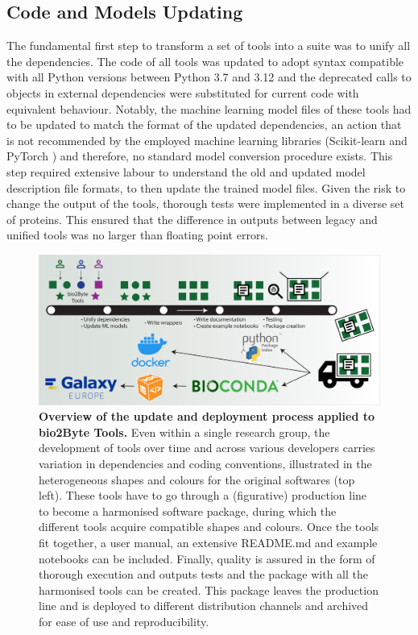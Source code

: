 \subsection{Code and Models Updating}
The fundamental first step to transform a set of tools into a suite was to unify all the dependencies. The code of all tools was updated to adopt syntax compatible with all Python versions between Python 3.7 and 3.12 and the deprecated calls to objects in external dependencies were substituted for current code with equivalent behaviour. Notably, the machine learning model files of these tools had to be updated to match the format of the updated dependencies, an action that is not recommended by the employed machine learning libraries (Scikit-learn \cite{scikit-learn} and PyTorch \cite{paszke_pytorch_2019}) and therefore, no standard model conversion procedure exists. This step required extensive labour to understand the old and updated model description file formats, to then update the trained model files. Given the risk to change the output of the tools, thorough tests were implemented in a diverse set of proteins. This ensured that the difference in outputs between legacy and unified tools was no larger than floating point errors.

\begin{figure}[!t]%
\includegraphics[width=\linewidth]{b2b_deployment/Fig/overview_slim.pdf}  
\centering
\caption{\textbf{Overview of the update and deployment process applied to bio2Byte Tools.} Even within a single research group, the development of tools over time and across various developers carries variation in dependencies and coding conventions, illustrated in the heterogeneous shapes and colours for the original softwares (top left). These tools have to go through a (figurative) production line to become a harmonised software package, during which the different tools acquire compatible shapes and colours. Once the tools fit together, a user manual, an extensive README.md and example notebooks can be included. Finally, quality is assured in the form of thorough execution and outputs tests and the package with all the harmonised tools can be created. This package leaves the production line and is deployed to different distribution channels and archived for ease of use and reproducibility.}
\label{overview_figure}
\end{figure}

